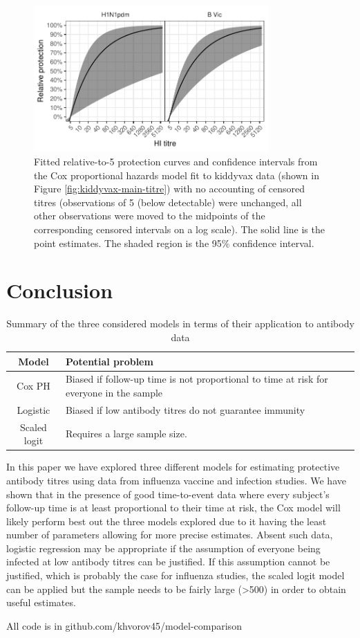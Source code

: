 \documentclass[12pt]{article}
\begin{document}
\begin{figure}[htp]
	\centering
	\includegraphics[width=0.8\textwidth]{../fit-cox-plot/kiddyvaxmain.pdf}
	\caption{
	Fitted relative-to-5 protection curves and confidence intervals from the Cox proportional hazards model fit to kiddyvax data (shown in Figure \ref{fig:kiddyvax-main-titre}) with no accounting of censored titres (observations of 5 (below detectable) were unchanged, all other observations were moved to the midpoints of the corresponding censored intervals on a log scale). The solid line is the point estimates. The shaded region is the 95\% confidence interval.
	}
	\label{fig:kiddyvaxmain-cox}
\end{figure}

\pagebreak
%
\section{Conclusion}

\begin{table}[htp]
\centering
\caption{Summary of the three considered models in terms of their application to antibody data}
\begin{tabular}{cp{25em}}
\toprule
Model & Potential problem \\
\midrule
Cox PH & Biased if follow-up time is not proportional to time at risk for everyone in the sample \\
Logistic & Biased if low antibody titres do not guarantee immunity \\
Scaled logit & Requires a large sample size. \\
\bottomrule
\end{tabular}
\end{table}

In this paper we have explored three different models for estimating protective antibody titres using data from influenza vaccine and infection studies.  We have shown that in the presence of good time-to-event data where every subject's follow-up time is at least proportional to their time at risk, the Cox model will likely perform best out the three models explored due to it having the least number of parameters allowing for more precise estimates. Absent such data, logistic regression may be appropriate if the assumption of everyone being infected at low antibody titres can be justified. If this assumption cannot be justified, which is probably the case for influenza studies, the scaled logit model can be applied but the sample needs to be fairly large (>500) in order to obtain useful estimates.

\pagebreak

All code is in github.com/khvorov45/model-comparison
\end{document}
